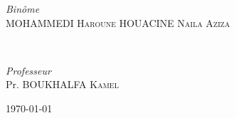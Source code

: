\begin{titlepage}
	\begin{minipage}{0.4\textwidth}
		\begin{flushleft}
			\large
			\textit{Binôme}\\
			MOHAMMEDI \textsc{Haroune} %
			HOUACINE \textsc{Naila Aziza} %
		\end{flushleft}
	\end{minipage}
	~
	\begin{minipage}{0.4\textwidth}
		\begin{flushright}
			\large
			\textit{Professeur}\\
			Pr. BOUKHALFA \textsc{Kamel} %
		\end{flushright}
	\end{minipage}
	
	
	\vfill\vfill\vfill %
	
	{\large\today} %
	
	
	\vfill %
	
\end{titlepage}
